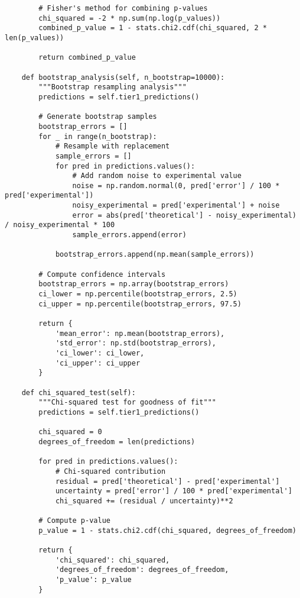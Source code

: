 \documentclass[11pt]{article}
\theoremstyle{definition}
\begin{document}
\begin{verbatim}
        # Fisher's method for combining p-values
        chi_squared = -2 * np.sum(np.log(p_values))
        combined_p_value = 1 - stats.chi2.cdf(chi_squared, 2 * len(p_values))
        
        return combined_p_value
    
    def bootstrap_analysis(self, n_bootstrap=10000):
        """Bootstrap resampling analysis"""
        predictions = self.tier1_predictions()
        
        # Generate bootstrap samples
        bootstrap_errors = []
        for _ in range(n_bootstrap):
            # Resample with replacement
            sample_errors = []
            for pred in predictions.values():
                # Add random noise to experimental value
                noise = np.random.normal(0, pred['error'] / 100 * pred['experimental'])
                noisy_experimental = pred['experimental'] + noise
                error = abs(pred['theoretical'] - noisy_experimental) / noisy_experimental * 100
                sample_errors.append(error)
            
            bootstrap_errors.append(np.mean(sample_errors))
        
        # Compute confidence intervals
        bootstrap_errors = np.array(bootstrap_errors)
        ci_lower = np.percentile(bootstrap_errors, 2.5)
        ci_upper = np.percentile(bootstrap_errors, 97.5)
        
        return {
            'mean_error': np.mean(bootstrap_errors),
            'std_error': np.std(bootstrap_errors),
            'ci_lower': ci_lower,
            'ci_upper': ci_upper
        }
    
    def chi_squared_test(self):
        """Chi-squared test for goodness of fit"""
        predictions = self.tier1_predictions()
        
        chi_squared = 0
        degrees_of_freedom = len(predictions)
        
        for pred in predictions.values():
            # Chi-squared contribution
            residual = pred['theoretical'] - pred['experimental']
            uncertainty = pred['error'] / 100 * pred['experimental']
            chi_squared += (residual / uncertainty)**2
        
        # Compute p-value
        p_value = 1 - stats.chi2.cdf(chi_squared, degrees_of_freedom)
        
        return {
            'chi_squared': chi_squared,
            'degrees_of_freedom': degrees_of_freedom,
            'p_value': p_value
        }
    

\end{verbatim}
\end{document}
